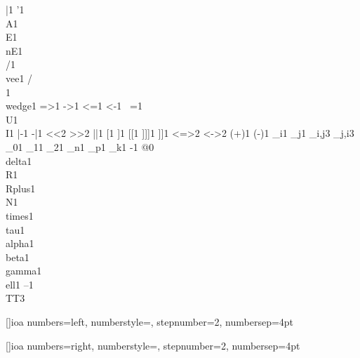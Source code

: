 {        {|}{{}}1
        {'}{{}}1
{\\A}{{}}1
        {\\E}{{}}1
        {\\nE}{{}}1
        {\\/}{{}}1
        {\\vee}{{}}1
        {/\\}{{}}1
        {\\wedge}{{}}1
        {=>}{{}}1
        {->}{{}}1
        {<=}{{}}1
        {<-}{{}}1
{~=}{{}}1
        {\\U}{{}}1
        {\\I}{{}}1
        {|-}{{}}1
        {-|}{{}}1
        {<<}{{}}2
        {>>}{{}}2
        {||}{{}}1
{[}{{}}1
        {]}{{}}1
        {[[}{{}}1
        {]]]}{{}}1
        {]]}{{}}1
        {<=>}{{}}2
        {<->}{{}}2
        {(+)}{{}}1
        {(-)}{{}}1
        {_i}{{}}1
        {_j}{{}}1
        {_{i,j}}{{}}3
        {_{j,i}}{{}}3
        {_0}{{}}1
        {_1}{{}}1
        {_2}{{}}1
        {_n}{{}}1
        {_p}{{}}1
        {_k}{{}}1
        {-}{{}}1
        {@}{{}}0
        {\\delta}{{}}1
        {\\R}{{}}1
        {\\Rplus}{{}}1
        {\\N}{{}}1
        {\\times}{{}}1
        {\\tau}{{}}1
        {\\alpha}{{}}1
        {\\beta}{{}}1
        {\\gamma}{{}}1
        {\\ell}{{}}1
        {--}{{}}1
        {\\TT}{{\hspace{1.5em}}}3
      }

[]{ioa}
{
  numbers=left,
  numberstyle=\tiny,
  stepnumber=2,
  numbersep=4pt
}

[]{ioa}
{
  numbers=right,
  numberstyle=\tiny,
  stepnumber=2,
  numbersep=4pt
}

